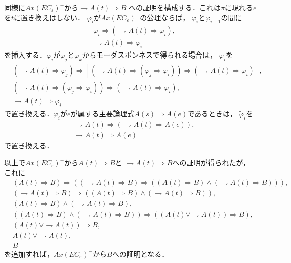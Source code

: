 	同様に$Ax(EC_{\varepsilon})^{-}$から$\rightharpoondown A(t) \Longrightarrow B$
	への証明を構成する．これは$\pi$に現れる$e$を$t$に置き換えはしない．
	$\varphi_{i}$が$Ax(EC_{\varepsilon})^{-}$の公理ならば，
	$\varphi_{i}$と$\varphi_{i+1}$の間に
	\begin{align}
		&\varphi_{i} \Longrightarrow (\rightharpoondown A(t) \Longrightarrow \varphi_{i}), \\
		&\rightharpoondown A(t) \Longrightarrow \varphi_{i}
	\end{align}
	を挿入する．$\varphi_{i}$が$\varphi_{j}$と$\varphi_{k}$からモーダスポンネスで得られる場合は，
	$\varphi_{i}$を
	\begin{align}
		&(\rightharpoondown A(t) \Longrightarrow \varphi_{j}) \Longrightarrow
		[(\rightharpoondown A(t) \Longrightarrow 
		(\varphi_{j}\Longrightarrow \varphi_{i}))
		\Longrightarrow (\rightharpoondown A(t) \Longrightarrow \varphi_{i})], \\
		&(\rightharpoondown A(t) \Longrightarrow 
		(\varphi_{j} \Longrightarrow \varphi_{i}))
		\Longrightarrow (\rightharpoondown A(t) \Longrightarrow \varphi_{i}), \\
		&\rightharpoondown A(t) \Longrightarrow \varphi_{i}
	\end{align}
	で置き換える．$\varphi_{i}$が$e$が属する主要論理式$A(s) \Longrightarrow A(e)$であるときは，
	$\tilde{\varphi}_{i}$を
	\begin{align}
		&\rightharpoondown A(t) \Longrightarrow (\rightharpoondown A(t) \Longrightarrow A(e)), \\
		&\rightharpoondown A(t) \Longrightarrow A(e)
	\end{align}
	で置き換える．
	
	以上で$Ax(EC_{\varepsilon})^{-}$から$A(t) \Longrightarrow B$と
	$\rightharpoondown A(t) \Longrightarrow B$への証明が得られたが，
	これに
	\begin{align}
		&(A(t) \Longrightarrow B) \Longrightarrow
		((\rightharpoondown A(t) \Longrightarrow B) \Longrightarrow
		((A(t) \Longrightarrow B) \wedge (\rightharpoondown A(t) \Longrightarrow B))), \\
		&(\rightharpoondown A(t) \Longrightarrow B) \Longrightarrow
		((A(t) \Longrightarrow B) \wedge (\rightharpoondown A(t) \Longrightarrow B)), \\
		&(A(t) \Longrightarrow B) \wedge (\rightharpoondown A(t) \Longrightarrow B), \\
		&((A(t) \Longrightarrow B) \wedge (\rightharpoondown A(t) \Longrightarrow B))
		\Longrightarrow ((A(t) \vee \rightharpoondown A(t)) \Longrightarrow B), \\
		&(A(t) \vee \rightharpoondown A(t)) \Longrightarrow B, \\
		&A(t) \vee \rightharpoondown A(t), \\
		&B
	\end{align}
	を追加すれば，$Ax(EC_{\varepsilon})^{-}$から$B$への証明となる．